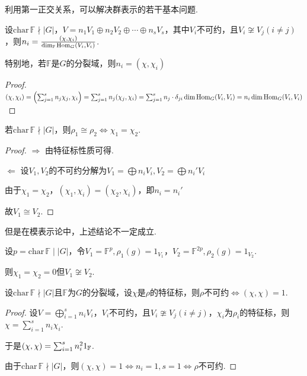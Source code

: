 利用第一正交关系，可以解决群表示的若干基本问题.\par

\begin{theorem}[不可约分解的重数]
    \wideline
    设$\mathrm{char}\,\mathbb{F}\nmid |G|$，$V=n_1V_1\oplus n_2V_2\oplus\cdots\oplus n_sV_s$，其中$V_i$不可约，且$V_i\not\cong V_j(i\neq j)$，则$n_i=\frac{(\chi,\chi_i)}{\dim_\mathbb{F}\operatorname{Hom}_G(V_i,V_i)}$.\par
    特别地，若$\mathbb{F}$是$G$的分裂域，则$n_i=(\chi,\chi_i)$
\end{theorem}

\begin{proof}
    $(\chi,\chi_i)=\left(\sum_{j=1}^s n_j\chi_j,\chi_i\right)=\sum_{j=1}^s n_j(\chi_j,\chi_i)=\sum_{j=1}^s n_j\cdot \delta_{ji}\dim\operatorname{Hom}_G(V_i,V_i)=n_i\dim\operatorname{Hom}_G(V_i,V_i)$
\end{proof}

\begin{theorem}[]
    若$\mathrm{char}\,\mathbb{F}\nmid |G|$，则$\rho_1\cong\rho_2\iff \chi_1=\chi_2$.
\end{theorem}

\begin{proof}
    $\Rightarrow$ 由特征标性质可得.\par
    $\Leftarrow$ 设$V_1,V_2$的不可约分解为$V_1=\bigoplus n_iV_i,V_2=\bigoplus n_i'V_i$\par
    由于$\chi_1=\chi_2$，$ (\chi_1,\chi_i)=(\chi_2,\chi_i)$，即$n_i=n_i'$\par
    故$V_1\cong V_2$.
\end{proof}

但是在模表示论中，上述结论不一定成立.\par

\begin{instance}
    设$p=\mathrm{char}\,\mathbb{F}\mid |G|$，令$V_1=\mathbb{F}^p,\rho_1(g)=1_{V_1}$，$V_2=\mathbb{F}^{2p},\rho_2(g)=1_{V_2}$.\par
    则$\chi_1=\chi_2=0$但$V_1\not\cong V_2$.
\end{instance}

\begin{theorem}[不可约表示判别法]
    设$\mathrm{char}\,\mathbb{F}\nmid |G|$且$\mathbb{F}$为$G$的分裂域，设$\chi$是$\rho$的特征标，则$\rho$不可约$\iff (\chi,\chi)=1$.
\end{theorem}
\begin{proof}
    设$V=\bigoplus_{i=1}^s n_iV_i$，$V_i$不可约，且$V_i\ncong V_j(i\neq j)$，$\chi_i$为$\rho_i$的特征标，则$\chi=\sum_{i=1}^s n_i\chi_i$.\par
    于是$(\chi,\chi)=\sum_{i=1}^sn_i^2 1_\mathbb{F}$.\par
    由于$\mathrm{char}\,\mathbb{F}\nmid |G|$，则$(\chi,\chi)=1\iff n_i=1,s=1 \iff \rho$不可约.
\end{proof}

